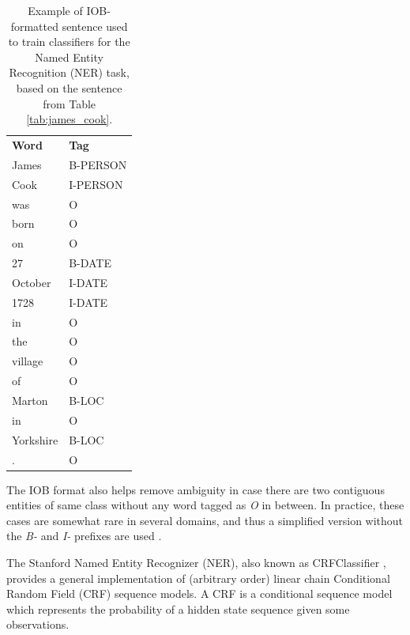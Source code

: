 \documentclass[11pt,a4paper,openright]{memoir}
\begin{document}
\begin{table}[!htbp]
  \centering
    \begin{tabular}{ll}
      \textbf{Word}          & \textbf{Tag} \\
      James                  & B-PERSON \\
      Cook                   & I-PERSON \\
      was                    & O \\
      born                   & O \\
      on                     & O \\
      27                     & B-DATE \\
      October                & I-DATE \\
      1728                   & I-DATE \\
      in                     & O \\
      the                    & O \\
      village                & O \\
      of                     & O \\
      Marton                 & B-LOC \\
      in                     & O \\
      Yorkshire              & B-LOC \\
      .                      & O \\
    \end{tabular}
  \caption[IOB-formatted sentence.]{Example of IOB-formatted sentence used to train classifiers for the Named Entity Recognition (NER) task, based on the sentence from Table \ref{tab:james_cook}.}
  \label{tab:james_cook_iob}
\end{table}

The IOB format also helps remove ambiguity in case there are two contiguous entities of same class without any word tagged as \emph{O} in between. In practice, these cases are somewhat rare in several domains, and thus a simplified version without the \emph{B-} and \emph{I-} prefixes are used \cite{Surdeanu:2011:CIE:2021153.2021155}.

The Stanford Named Entity Recognizer (NER), also known as CRFClassifier \cite{Finkel:2005:INI:1219840.1219885}, provides a general implementation of (arbitrary order) linear chain Conditional Random Field (CRF) sequence models. A CRF is a conditional sequence model which represents the probability of a hidden state sequence given some observations.
\end{document}
